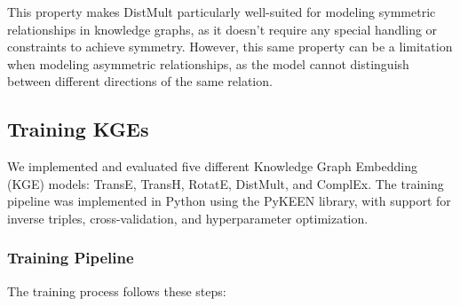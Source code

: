 \documentclass[10pt,a4paper]{article}
\begin{document}
This property makes DistMult particularly well-suited for modeling symmetric relationships in knowledge graphs, as it doesn't require any special handling or constraints to achieve symmetry. However, this same property can be a limitation when modeling asymmetric relationships, as the model cannot distinguish between different directions of the same relation.

\subsection{Training KGEs}

We implemented and evaluated five different Knowledge Graph Embedding (KGE) models: TransE, TransH, RotatE, DistMult, and ComplEx. The training pipeline was implemented in Python using the PyKEEN library, with support for inverse triples, cross-validation, and hyperparameter optimization.

\subsubsection{Training Pipeline}

The training process follows these steps:
\end{document}
